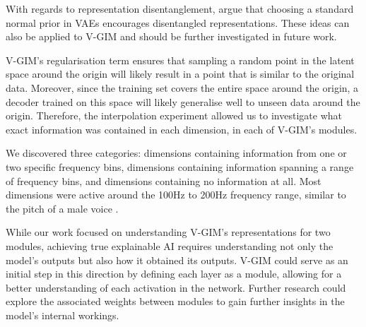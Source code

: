 	With regards to representation disentanglement, \cite{burgessUnderstandingDisentanglingBeta2018} argue that choosing a standard normal prior in VAEs encourages disentangled representations. These ideas can also be applied to V-GIM and should be further investigated in future work.
	
	
	
	V-GIM's regularisation term ensures that sampling a random point in the latent space around the origin will likely result in a point that is similar to the original data. Moreover, since the training set covers the entire space around the origin, a decoder trained on this space will likely generalise well to unseen data around the origin. Therefore, the interpolation experiment allowed us to investigate what exact information was contained in each dimension, in each of V-GIM's modules. 
	
	We discovered three categories: dimensions containing information from one or two specific frequency bins, dimensions containing information spanning a range of frequency bins, and dimensions containing no information at all. Most dimensions were active around the 100Hz to 200Hz frequency range, similar to the pitch of a male voice \citep{rePreferencesVeryLow2012}.
	
	While our work focused on understanding V-GIM's representations for two modules, achieving true explainable AI requires understanding not only the model's outputs but also how it obtained its outputs. V-GIM could serve as an initial step in this direction by defining each layer as a module, allowing for a better understanding of each activation in the network. Further research could explore the associated weights between modules to gain further insights in the model's internal workings.

		 
	
